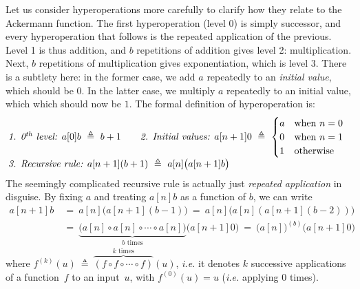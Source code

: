 Let us consider hyperoperations more carefully
to clarify how they relate to the Ackermann function.
The first hyperoperation (level 0) is simply successor, and 
every hyperoperation that follows is the repeated application of the previous.
Level 1 is thus addition, and $b$ repetitions of addition
gives level 2: multiplication. Next, $b$ repetitions of
multiplication gives exponentiation, which is level 3. 
There is a subtlety here: in the former case, we add $a$
repeatedly to an \emph{initial value}, which should be $0$.
In the latter case, we multiply $a$ repeatedly to an initial value, which 
which should now be $1$. The formal definition of hyperoperation is:
\begin{equation}
\label{eq:hyper}
\begin{array}{@{}l@{\qquad}l}
\textit{1. 0$^{\textit{th}}$ level: } a[0]b ~ \triangleq ~ b + 1 &
\textit{2. Initial values: } a[n+1]0 ~ \triangleq ~
  \begin{cases}
    a & \text{when } n = 0 \\
    0 & \text{when } n = 1 \\
    1 & \text{otherwise}
  \end{cases} \\
\multicolumn{2}{@{}l}{\textit{3. Recursive rule: } a[n+1](b+1) ~ \triangleq ~ a[n]\big(a[n+1]b\big)}
\end{array}
\end{equation}
The seemingly complicated recursive rule is actually just \emph{repeated application} in disguise. By fixing $a$ and treating $a[n]b$ as a function of $b$, we can write
\begin{equation*}
\begin{array}{lll}
a[n+1]b ~& = ~ a[n]\big(a[n+1](b-1)\big) ~ = ~ a[n]\big(a[n](a[n+1](b-2))\big) \\
& = ~ \underbrace{\big( a[n]\circ a[n]\circ \cdots \circ a[n] \big)}_{b \text{ times}} \big(a[n+1]0\big)  ~ = ~ \big(a[n]\big)^{(b)}\big(a[n+1]0\big)
\end{array}
\end{equation*}
where $f^{(k)}(u) ~ \triangleq ~ \overbrace{(f\circ f\circ \cdots \circ f)}^{k \text{ times}} (u)$, 
\emph{i.e.} it denotes $k$ successive applications of a function~$f$ to an 
input~$u$, with $f^{(0)}(u) = u$ (\emph{i.e.} applying $0$ times). 

